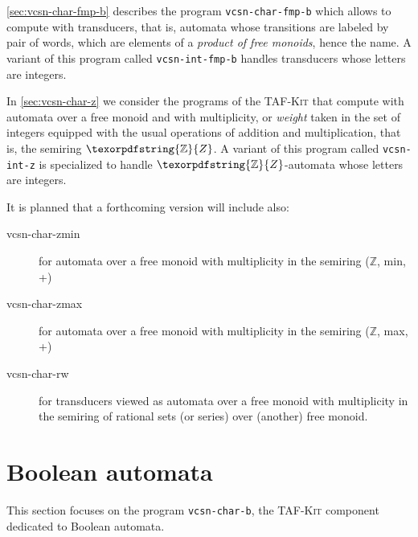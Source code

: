 \documentclass[a4paper]{report}
\renewcommand{\max}{\textrm{max}}
\renewcommand{\min}{\textrm{min}}
\newcommand{\Z}{\texorpdfstring{\ensuremath{\mathbb{Z}}}{Z}}
\newcommand{\Index}[1]{\index{#1}#1}
\newcommand\command[1]{\texttt{#1}}
\newcommand{\tafkit}{\textsc{TAF-Kit}\xspace}
\begin{document}
\autoref{sec:vcsn-char-fmp-b} describes the program
\command{vcsn-char-fmp-b} which allows to compute with transducers, that
is, automata whose transitions are labeled by pair of words, which are
elements of a \emph{product of free monoids}, hence the name.  A
variant of this program called \command{vcsn-int-fmp-b} handles
transducers whose letters are integers.

In \autoref{sec:vcsn-char-z} we consider the programs of the \tafkit
that compute with automata over a free monoid and with multiplicity,
or \emph{weight} taken in the set of integers equipped with the usual
operations of addition and multiplication, that is, the semiring $\Z$.
A variant of this program called \command{vcsn-int-z} is specialized
to handle $\Z$-automata whose letters are integers.


\medskip


It is planned that a forthcoming version will include also:

\begin{description}
\item[vcsn-char-zmin] for automata over a free monoid with multiplicity in
  the semiring (\Z, \min, +)

\item[vcsn-char-zmax] for automata over a free monoid with multiplicity in the
  semiring (\Z, \max, +)

\item[vcsn-char-rw] for transducers viewed as automata over a free
  monoid with multiplicity in the semiring of rational sets (or
  series) over (another) free monoid.
\end{description}

\newpage

\section{Boolean automata}
\label{sec:vcsn-char-b}

This section focuses on the program \Index{\command{vcsn-char-b}}, the
\tafkit component dedicated to Boolean automata.
\end{document}
